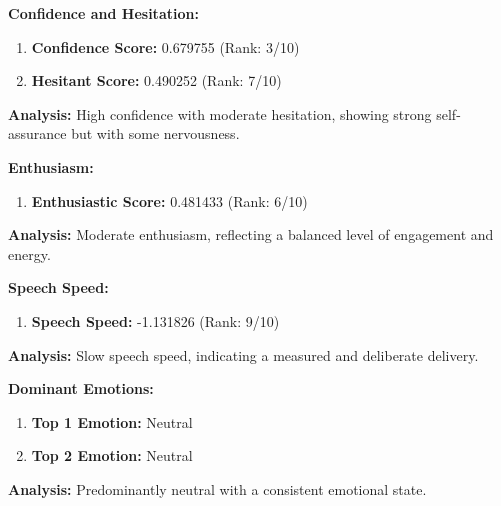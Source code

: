 \documentclass{article}
\begin{document}
\large{\textbf{Confidence and Hesitation:}}
\begin{tcolorbox}[ colback=purple!5!white,colframe=purple!75!black,  title=Confidence and Hesitant Scores]
    \begin{enumerate}
        \item \textbf{Confidence Score:} \textcolor{green!50!black}{0.679755} (Rank: 3/10)
        \item \textbf{Hesitant Score:} \textcolor{red!70!black}{0.490252} (Rank: 7/10)
    \end{enumerate}
\end{tcolorbox}
    \textbf{Analysis:} High confidence with moderate hesitation, showing strong self-assurance but with some nervousness.

\large{\textbf{Enthusiasm:}}
\begin{tcolorbox}[colback=red!5!white,colframe=red!75!black,title=Enthusiastic Score]
    \begin{enumerate}
        \item \textbf{Enthusiastic Score:} \textcolor{orange!70!black}{0.481433} (Rank: 6/10)
    \end{enumerate}
\end{tcolorbox}
    \textbf{Analysis:} Moderate enthusiasm, reflecting a balanced level of engagement and energy.

\large{\textbf{Speech Speed:}}
\begin{tcolorbox}[colback=cyan!5!white,colframe=cyan!75!black,title=Speech Speed]
    \begin{enumerate}
        \item \textbf{Speech Speed:} \textcolor{purple!70!black}{-1.131826} (Rank: 9/10)
    \end{enumerate}
\end{tcolorbox}
    \textbf{Analysis:} Slow speech speed, indicating a measured and deliberate delivery.

\large{\textbf{Dominant Emotions:}}
\begin{tcolorbox}[title=Emotional State]
    \begin{enumerate}
        \item \textbf{Top 1 Emotion:} \textcolor{blue!80!black}{Neutral}
        \item \textbf{Top 2 Emotion:} \textcolor{red!80!black}{Neutral}
    \end{enumerate}
\end{tcolorbox}
    \textbf{Analysis:} Predominantly neutral with a consistent emotional state.
\end{document}
